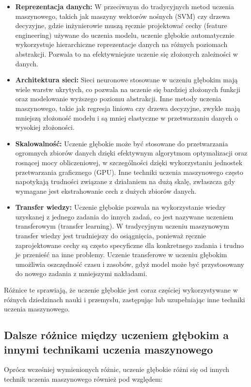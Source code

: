 \begin{itemize}
\item \textbf{Reprezentacja danych:} W przeciwnym do tradycyjnych metod uczenia maszynowego, takich jak maszyny wektorów nośnych (SVM) czy drzewa decyzyjne, gdzie inżynierowie muszą ręcznie projektować cechy (feature engineering) używane do uczenia modelu, uczenie głębokie automatycznie wykorzystuje hierarchiczne reprezentacje danych na różnych poziomach abstrakcji. Pozwala to na efektywniejsze uczenie się złożonych zależności w danych.

\item \textbf{Architektura sieci:} Sieci neuronowe stosowane w uczeniu głębokim mają wiele warstw ukrytych, co pozwala na uczenie się bardziej złożonych funkcji oraz modelowanie wyższego poziomu abstrakcji. Inne metody uczenia maszynowego, takie jak regresja liniowa czy drzewa decyzyjne, zwykle mają mniejszą złożoność modelu i są mniej elastyczne w przetwarzaniu danych o wysokiej złożoności.

\item \textbf{Skalowalność:} Uczenie głębokie może być stosowane do przetwarzania ogromnych zbiorów danych dzięki efektywnym algorytmom optymalizacji oraz rosnącej mocy obliczeniowej, w szczególności dzięki wykorzystaniu jednostek przetwarzania graficznego (GPU). Inne techniki uczenia maszynowego często napotykają trudności związane z działaniem na dużą skalę, zwłaszcza gdy wymagane jest ekstrahowanie cech z dużych zbiorów danych.

\item \textbf{Transfer wiedzy:} Uczenie głębokie pozwala na wykorzystanie wiedzy uzyskanej z jednego zadania do innych zadań, co jest nazywane uczeniem transferowym (transfer learning). W tradycyjnym uczeniu maszynowym transfer wiedzy jest trudniejszy do osiągnięcia, ponieważ ręcznie zaprojektowane cechy są często specyficzne dla konkretnego zadania i trudno je przenieść na inne problemy. Uczenie transferowe w uczeniu głębokim umożliwia oszczędność czasu i zasobów, gdyż model może być przystosowany do nowego zadania z mniejszymi nakładami.

\end{itemize}

Różnice te sprawiają, że uczenie głębokie jest coraz częściej wykorzystywane w różnych dziedzinach nauki i przemysłu, zastępując lub uzupełniając inne techniki uczenia maszynowego.

\subsection{Dalsze różnice między uczeniem głębokim a innymi technikami uczenia maszynowego}
Oprócz wcześniej wymienionych różnic, uczenie głębokie różni się od innych technik uczenia maszynowego również pod względem:

